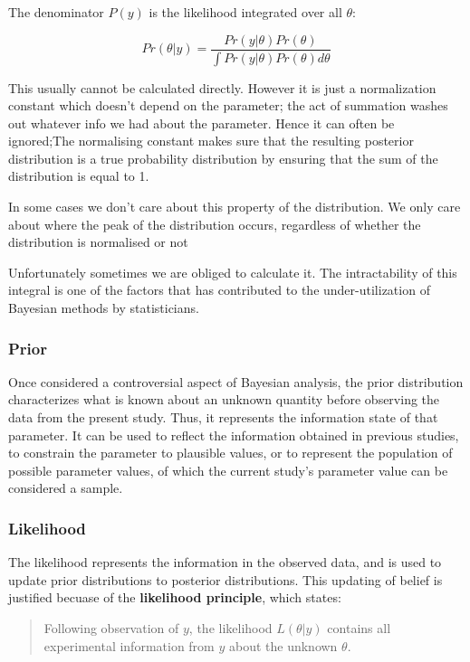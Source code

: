 \documentclass[11pt]{article}
\begin{document}
The denominator \(P(y)\) is the likelihood integrated over all
\(\theta\):

\[Pr(\theta|y) = \frac{Pr(y|\theta)Pr(\theta)}{\int Pr(y|\theta)Pr(\theta) d\theta}\]

This usually cannot be calculated directly. However it is just a
normalization constant which doesn't depend on the parameter; the act of
summation washes out whatever info we had about the parameter. Hence it
can often be ignored;The normalising constant makes sure that the
resulting posterior distribution is a true probability distribution by
ensuring that the sum of the distribution is equal to 1.

In some cases we don't care about this property of the distribution. We
only care about where the peak of the distribution occurs, regardless of
whether the distribution is normalised or not

Unfortunately sometimes we are obliged to calculate it. The
intractability of this integral is one of the factors that has
contributed to the under-utilization of Bayesian methods by
statisticians.

\hypertarget{prior}{%
\subsubsection{Prior}\label{prior}}

Once considered a controversial aspect of Bayesian analysis, the prior
distribution characterizes what is known about an unknown quantity
before observing the data from the present study. Thus, it represents
the information state of that parameter. It can be used to reflect the
information obtained in previous studies, to constrain the parameter to
plausible values, or to represent the population of possible parameter
values, of which the current study's parameter value can be considered a
sample.

\hypertarget{likelihood}{%
\subsubsection{Likelihood}\label{likelihood}}

The likelihood represents the information in the observed data, and is
used to update prior distributions to posterior distributions. This
updating of belief is justified becuase of the \textbf{likelihood
principle}, which states:

\begin{quote}
Following observation of \(y\), the likelihood \(L(\theta|y)\) contains
all experimental information from \(y\) about the unknown \(\theta\).
\end{quote}
\end{document}
